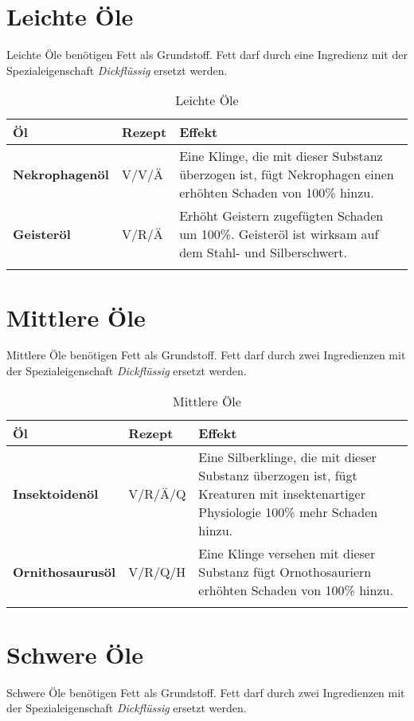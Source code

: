 \section{Leichte Öle}
Leichte Öle benötigen Fett als Grundstoff. Fett darf durch eine Ingredienz mit der Spezialeigenschaft \textit{Dickflüssig} ersetzt werden.

\begin{longtable}{|p{4cm}|p{}|p{9cm}|}
\hline
\textbf{Öl} & \textbf{Rezept} & \textbf{Effekt} \\ \hline

\textbf{Nekrophagenöl} & V/V/Ä & Eine Klinge, die mit dieser Substanz überzogen ist, fügt Nekrophagen einen erhöhten Schaden von 100\% hinzu. \\ \hline

\textbf{Geisteröl} & V/R/Ä & Erhöht Geistern zugefügten Schaden um 100\%. Geisteröl ist wirksam auf dem Stahl- und Silberschwert.  \\ \hline

\caption{Leichte Öle}
\label{tab:leichte_oele}
\end{longtable}


\section{Mittlere Öle}
Mittlere Öle benötigen Fett als Grundstoff. Fett darf durch zwei Ingredienzen mit der Spezialeigenschaft \textit{Dickflüssig} ersetzt werden.

\begin{longtable}{|p{4cm}|p{}|p{9cm}|}
\hline
\textbf{Öl} & \textbf{Rezept} & \textbf{Effekt} \\ \hline

\textbf{Insektoidenöl} & V/R/Ä/Q & Eine Silberklinge, die mit dieser Substanz überzogen ist, fügt Kreaturen mit insektenartiger Physiologie 100\% mehr Schaden hinzu. \\ \hline

\textbf{Ornithosaurusöl} & V/R/Q/H & Eine Klinge versehen mit dieser Substanz fügt Ornothosauriern erhöhten Schaden von 100\% hinzu.  \\ \hline

\caption{Mittlere Öle}
\label{tab:mittlere_oele}
\end{longtable}


\section{Schwere Öle}
Schwere Öle benötigen Fett als Grundstoff. Fett darf durch zwei Ingredienzen mit der Spezialeigenschaft \textit{Dickflüssig} ersetzt werden.

